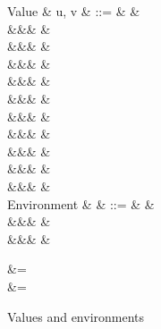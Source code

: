 \begin{figure}
\begin{syntaxfig}
\small
\mbox{Value}
&
u, v
&
::=
&
\exUnit
&
\\
&&&
&
\\
&&&
&
\\
&&&
&
\\
&&&
&
\\
&&&
&
\\
&&&
&
\\
&&&
&
\\
&&&
\exClosure{\rho}{\exFun{\sigma}}
&
\\
&&&
&
\\
&&&
&
\\[1mm]
\mbox{Environment}
&
\rho
&
::=
&
\envEmpty
&
\\
&&&
&
\\
&&&
&
\end{syntaxfig}
\flushleft {}
\begin{salign}
    &= \envEmpty
   \\
    &= 
\end{salign}
\caption{Values and environments}
\end{figure}
